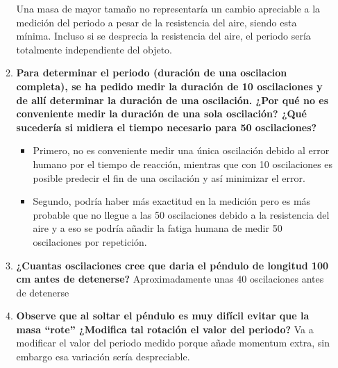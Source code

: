\begin{enumerate}
\begin{enumerate}
    
Una masa de mayor tamaño no representaría un cambio apreciable a la medición del periodo a pesar de la resistencia del aire, siendo esta mínima. Incluso si se desprecia la resistencia del aire, el periodo sería totalmente independiente del objeto.
    \item \textbf{Para determinar el periodo (duración de una oscilacion completa), se ha pedido medir la duración de 10 oscilaciones y de allí determinar la duración de una oscilación. ¿Por qué no es conveniente medir la duración de una sola oscilación? ¿Qué sucedería si midiera el tiempo necesario para 50 oscilaciones?}
    \begin{itemize}
        \item Primero, no es conveniente medir una única oscilación debido al error humano por el tiempo de reacción, mientras que con 10 oscilaciones es posible predecir el fin de una oscilación y así minimizar el error.
        \item Segundo, podría haber más exactitud en la medición pero es más probable que no llegue a las 50 oscilaciones debido a la resistencia del aire y a eso se podría añadir la fatiga humana de medir 50 oscilaciones por repetición. 
    \end{itemize}

    \item \textbf{¿Cuantas oscilaciones cree que daria el péndulo de longitud 100 cm antes de detenerse?}
Aproximadamente unas 40 oscilaciones antes de detenerse  
    \item \textbf{Observe que al soltar el p\'endulo es muy dif\'icil evitar que la masa “rote” ¿Modifica tal rotación el valor del periodo?}
Va a modificar el valor del periodo medido porque añade momentum extra, sin embargo esa variación sería despreciable. 

\end{enumerate}

\end{enumerate}
